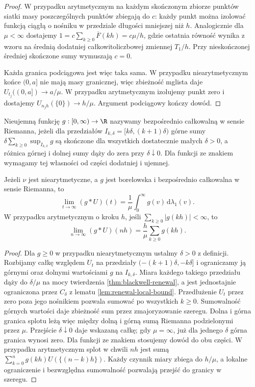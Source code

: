 \begin{proof}
W przypadku arytmetycznym na każdym skończonym
zbiorze punktów siatki masy poszczególnych punktów
zbiegają do $c$:
każdy punkt można izolować funkcją ciągłą
o nośniku w przedziale długości mniejszej niż $h$.
Analogicznie dla $\mu<\infty$ dostajemy
$1=c\sum_{k\ge0}\overline F(kh)=c\mu/h$,
gdzie ostatnia równość wynika z wzoru na średnią
dodatniej całkowitoliczbowej zmiennej $T_1/h$.
Przy nieskończonej średniej skończone sumy
wymuszają $c=0$.

Każda granica podciągowa jest więc taka sama.
W przypadku niearytmetycznym końce $(0,a]$
nie mają masy granicznej, więc zbieżność mglista
daje $U_{t_j}((0,a])\to a/\mu$.
W przypadku arytmetycznym izolujemy punkt zero
i dostajemy $U_{n_jh}(\{0\})\to h/\mu$.
Argument podciągowy kończy dowód.
\end{proof}

\begin{definicja}
Nieujemną funkcję $g:[0,\infty)\to\R$ nazywamy
bezpośrednio całkowalną w sensie Riemanna, jeżeli
dla przedziałów $I_{k,\delta}=[k\delta,(k+1)\delta)$
górne sumy
$\delta\sum_{k\ge0}\sup_{I_{k,\delta}}g$
są skończone dla wszystkich dostatecznie małych
$\delta>0$, a różnica górnej i dolnej sumy
dąży do zera przy $\delta\downarrow0$.
Dla funkcji ze znakiem wymagamy tej własności
od części dodatniej i ujemnej.
\end{definicja}

\begin{twierdzenie}
\label{thm:key-renewal}
Jeżeli $\nu$ jest niearytmetyczne, a $g$ jest
borelowska i bezpośrednio całkowalna w sensie
Riemanna, to
\[
\lim_{t\to\infty}(g*U)(t)
=\frac1\mu\int_0^\infty g(v)\,\mathrm d\lambda_1(v).
\]
W przypadku arytmetycznym o kroku $h$,
jeśli $\sum_{k\ge0}|g(kh)|<\infty$, to
\[
\lim_{n\to\infty}(g*U)(nh)
=\frac h\mu\sum_{k\ge0}g(kh).
\]
\end{twierdzenie}
\begin{proof}
Dla $g\ge0$ w przypadku niearytmetycznym
ustalmy $\delta>0$ z definicji.
Rozbijamy całkę względem $U_t$ na przedziały
$(- (k+1)\delta,-k\delta]$ i ograniczamy ją
górnymi oraz dolnymi wartościami $g$ na
$I_{k,\delta}$. Miara każdego takiego przedziału
dąży do $\delta/\mu$ na mocy twierdzenia
\ref{thm:blackwell-renewal}, a jest jednostajnie
ograniczona przez $C_\delta$ z lematu
\ref{lem:renewal-local-bound}. Przedłużenie
$U_t$ przez zero poza jego nośnikiem pozwala
sumować po wszystkich $k\ge0$.
Sumowalność górnych wartości daje zbieżność
sum przez zmajoryzowanie szeregu.
Dolna i górna granica splotu leżą więc między
dolną i górną sumą Riemanna podzielonymi przez
$\mu$. Przejście $\delta\downarrow0$ daje
wskazaną całkę; gdy $\mu=\infty$, już dla
jednego $\delta$ górna granica wynosi zero.
Dla funkcji ze znakiem stosujemy dowód do obu części.
W przypadku arytmetycznym splot w chwili $nh$
jest sumą $\sum_{k=0}^n g(kh)U(\{(n-k)h\})$.
Każdy czynnik miary zbiega do $h/\mu$,
a lokalne ograniczenie i bezwzględna sumowalność
pozwalają przejść do granicy w szeregu.
\end{proof}

